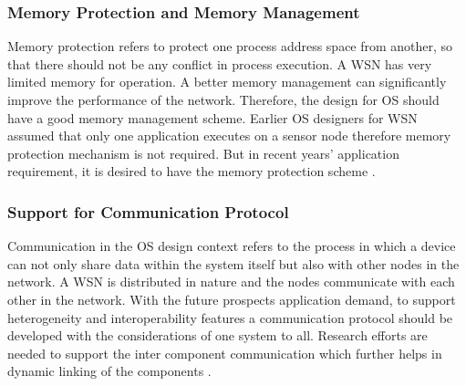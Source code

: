 \documentclass[12pt,journal,communications surveys and tutorials]{IEEEtran}
\begin{document}
\subsubsection{Memory Protection and Memory Management}
Memory protection refers to protect one process address space from another, so that there should not be any conflict in process execution. A WSN has very limited memory for operation. A better memory management can significantly improve the performance of the network. Therefore, the design for OS should have a good memory management scheme.  Earlier OS designers for WSN assumed that only one application executes on a sensor node therefore memory protection mechanism is not required\cite{farooq2011operating}. But in recent years' application requirement, it is desired to have the memory protection scheme \cite{dutta2012operating}.
\subsubsection{Support for Communication Protocol}
Communication in the OS design context refers to the process in which a device can not only share data within the system itself but also with other nodes in the network. A WSN is distributed in nature and the nodes communicate with each other in the network. With the future prospects application demand, to support heterogeneity and interoperability features a communication protocol should be developed with the considerations of one system to all. Research efforts are needed to support the inter component communication which further helps in dynamic linking of the components \cite{stathopoulos2003remote}.
\end{document}
